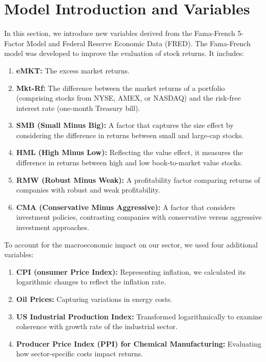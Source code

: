 \section{Model Introduction and Variables}

In this section, we introduce new variables derived from the Fama-French 5-Factor Model and Federal Reserve Economic Data 
(FRED). 
The Fama-French model was developed to improve the evaluation of stock returns.
 It includes:
\begin{enumerate}
    \item \textbf{eMKT:} The excess market returns.
    \item \textbf{Mkt-Rf:} The difference between the market returns of a portfolio (comprising stocks from NYSE, AMEX, or
    NASDAQ) and the risk-free interest rate (one-month Treasury bill).
    \item \textbf{SMB (Small Minus Big):} A factor that captures the size effect by considering the difference in returns
    between small and large-cap stocks.
    \item \textbf{HML (High Minus Low):} Reflecting the value effect, it measures the difference in returns between high and
    low book-to-market value stocks.
    \item \textbf{RMW (Robust Minus Weak):} A profitability factor comparing returns of companies with robust and weak 
    profitability.
    \item \textbf{CMA (Conservative Minus Aggressive):} A factor that considers investment policies, contrasting companies 
    with conservative versus aggressive investment approaches.
\end{enumerate}

To account for the macroeconomic impact on our sector, we used four additional variables:

\begin{enumerate}[resume*]
    \item \textbf{CPI (onsumer Price Index):} Representing inflation, we calculated its logarithmic changes to reflect the inflation rate.
    \item \textbf{Oil Prices:} Capturing variations in energy costs.
    \item \textbf{US Industrial Production Index:} Transformed logarithmically to examine coherence with growth rate of the
    industrial sector.
    \item \textbf{Producer Price Index (PPI) for Chemical Manufacturing:} Evaluating how sector-specific costs impact returns.
\end{enumerate}

